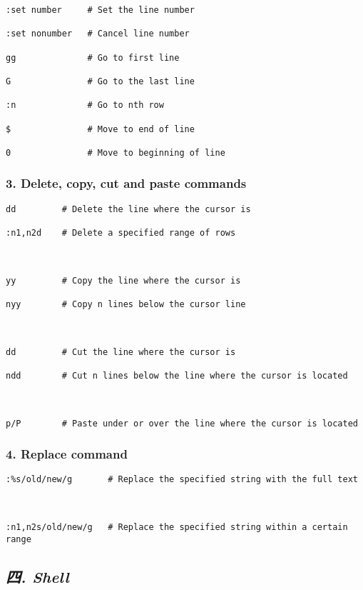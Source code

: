 \documentclass[
]{article}
\begin{document}
\begin{verbatim}
:set number     # Set the line number

:set nonumber   # Cancel line number

gg              # Go to first line

G               # Go to the last line

:n              # Go to nth row

$               # Move to end of line

0               # Move to beginning of line
\end{verbatim}

\hypertarget{header-n144}{%
\subsubsection{3. Delete, copy, cut and paste
commands}\label{header-n144}}

\begin{verbatim}
dd         # Delete the line where the cursor is

:n1,n2d    # Delete a specified range of rows



yy         # Copy the line where the cursor is

nyy        # Copy n lines below the cursor line



dd         # Cut the line where the cursor is

ndd        # Cut n lines below the line where the cursor is located



p/P        # Paste under or over the line where the cursor is located
\end{verbatim}

\hypertarget{header-n146}{%
\subsubsection{4. Replace command}\label{header-n146}}

\begin{verbatim}
:%s/old/new/g       # Replace the specified string with the full text



:n1,n2s/old/new/g   # Replace the specified string within a certain range
\end{verbatim}

\hypertarget{header-n150}{%
\subsection{\texorpdfstring{\emph{四.
Shell}}{四. Shell}}\label{header-n150}}
\end{document}
